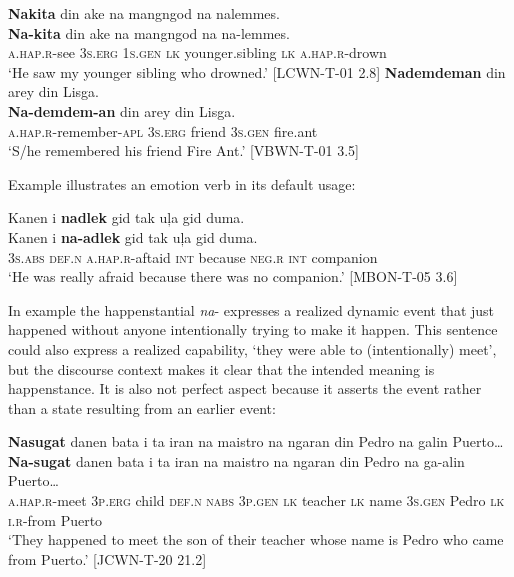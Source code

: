 \ea
\label{bkm:Ref448318853}
\textbf{Nakita}  din  ake  na  mangngod  na  nalemmes. \\\smallskip
 \gll \textbf{Na-kita}  din  ake  na  mangngod  na  na-lemmes. \\
\textsc{a.hap.r}-see  3\textsc{s.erg}  1\textsc{s.gen}  \textsc{lk}  younger.sibling  \textsc{lk}   \textsc{a.hap.r}-drown \\
\glt ‘He saw my younger sibling who drowned.’ [LCWN-T-01 2.8]
\z
\ea
\label{bkm:Ref120012965}
\textbf{Nademdeman}  din  arey  din  Lisga. \\\smallskip
 \gll \textbf{Na-demdem-an}  din  arey  din  Lisga.\footnotemark{} \\
\textsc{a.hap.r}-remember-\textsc{apl}  3\textsc{s.erg}  friend  3\textsc{s.gen}  fire.ant \\
\glt ‘S/he remembered his friend Fire Ant.’ [VBWN-T-01 3.5]
\z

Example  illustrates an emotion verb in its default usage:

\ea
\label{bkm:Ref508296047}
Kanen  i  \textbf{nadlek}  gid  tak  uļa  gid  duma. \\\smallskip
 \gll Kanen  i  \textbf{na-adlek}  gid  tak  uļa  gid  duma. \\
3\textsc{s.abs}  \textsc{def.n}  \textsc{a.hap.r}-aftaid  \textsc{int} because  \textsc{neg.r}  \textsc{int}  companion \\
\glt ‘He was really afraid because there was no companion.’ [MBON-T-05 3.6]
\z

In example  the happenstantial \textit{na}{}- expresses a realized dynamic event that just happened without anyone intentionally trying to make it happen. This sentence could also express a realized capability, ‘they were able to (intentionally) meet’, but the discourse context makes it clear that the intended meaning is happenstance. It is also not perfect aspect because it asserts the event rather than a state resulting from an earlier event:

\ea
\label{bkm:Ref396387524}
\textbf{Nasugat}  danen  bata  i  ta  iran   na  maistro  na  ngaran din Pedro  na  galin  Puerto… \\\smallskip
 \gll \textbf{Na-sugat}  danen  bata  i  ta  iran   na  maistro  na  ngaran din Pedro  na  ga-alin  Puerto… \\
\textsc{a.hap.r}-meet  3\textsc{p.erg}  child  \textsc{def.n}  \textsc{nabs} 3\textsc{p.gen}  \textsc{lk}  teacher  \textsc{lk}  name
 3\textsc{s.gen} Pedro \textsc{lk}  \textsc{i.r}-from  Puerto \\
\glt `They happened to meet the son of their teacher whose name is Pedro who came from Puerto.’ [JCWN-T-20 21.2]
\z

